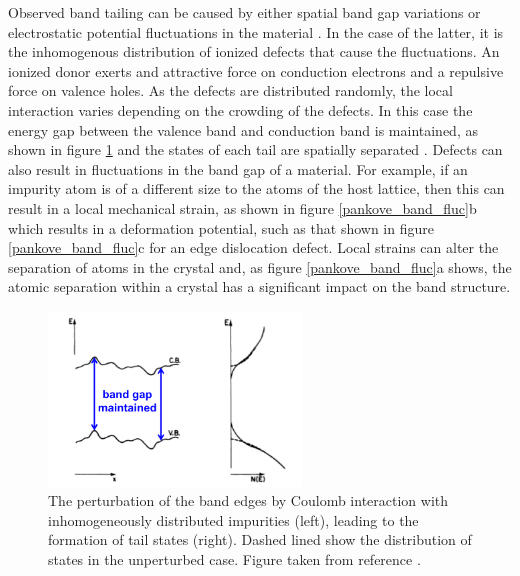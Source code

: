 Observed band tailing can be caused by either spatial band gap variations or electrostatic potential fluctuations in the material \cite{band_tail}. In the case of the latter, it is the inhomogenous distribution of ionized defects that cause the fluctuations. An ionized donor exerts and attractive force on conduction electrons and a repulsive force on valence holes. As the defects are distributed randomly, the local interaction varies depending on the crowding of the defects. In this case the energy gap between the valence band and conduction band is maintained, as shown in figure \ref{pankove_elec_fluc} and the states of each tail are spatially separated \cite{Pankove}. Defects can also result in fluctuations in the band gap of a material. For example, if an impurity atom is of a different size to the atoms of the host lattice, then this can result in a local mechanical strain, as shown in figure \ref{pankove_band_fluc}b which results in a deformation potential, such as that shown in figure \ref{pankove_band_fluc}c for an edge dislocation defect. Local strains can alter the separation of atoms in the crystal and, as figure \ref{pankove_band_fluc}a shows, the atomic separation within a crystal has a significant impact on the band structure.

\begin{figure}[h!]
  \centering
    \includegraphics[width=0.6\textwidth]{figures/pankove_elec_fluc.png}
    \caption{The perturbation of the band edges by Coulomb interaction with inhomogeneously distributed impurities (left), leading to the formation of tail states (right). Dashed lined show the distribution of states in the unperturbed case. Figure taken from reference .}
  \label{pankove_elec_fluc}
\end{figure}

